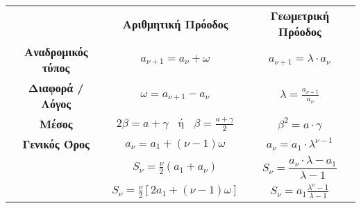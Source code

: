 \begin{tabular}{ccc}
\hline \rule[-2ex]{0pt}{5.5ex}  & \textbf{Αριθμητική Πρόοδος} & \textbf{Γεωμετρική Πρόοδος} \\ 
\hhline{===} \rule[-2ex]{0pt}{5.5ex} \textbf{Αναδρομικός τύπος} & $ a_{\nu+1}=a_\nu+\omega $ & $ a_{\nu+1}=\lambda\cdot a_\nu $ \\ 
 \rule[-2ex]{0pt}{5.5ex} \textbf{Διαφορά / Λόγος} & $ \omega=a_{\nu+1}-a_\nu $ & $ \lambda=\frac{a_{\nu+1}}{a_\nu} $ \\ 
 \rule[-2ex]{0pt}{5.5ex} \textbf{Μέσος} & $ 2\beta=a+\gamma\;\;\textrm{ ή }\;\;\beta=\frac{a+\gamma}{2} $ & $ \beta^2=a\cdot\gamma $ \\ 
 \rule[-2ex]{0pt}{5.5ex} \textbf{Γενικός Όρος} & $ a_\nu=a_1+(\nu-1)\omega $ & $ a_\nu=a_1\cdot\lambda^{\nu-1} $ \\ 
\hhline{~--} \multirow{3}{*}{\textbf{Άθροισμα}} & $ S_\nu=\frac{\nu}{2}(a_1+a_\nu) $ & $ S_\nu=\dfrac{a_\nu\cdot\lambda-a_1}{\lambda-1} $  \rule[-2ex]{0pt}{7ex}\\ 
 \rule[-2ex]{0pt}{5.5ex}  & $ S_\nu=\frac{\nu}{2}\left[2a_1+(\nu-1)\omega\right]  $ & $ S_\nu=a_1\frac{\lambda^\nu-1}{\lambda-1} $ \\ 
\hline 
\end{tabular} 
